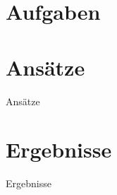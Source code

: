 \documentclass
[
  draft    = true,
  fontsize = 11pt,
  parskip  = half-,
  BCOR     = 0pt,
  DIV      = 11,
  ngerman,
  dvipsnames
]
{scrbook}
\begin{document}


\tableofcontents

\cleardoublepage
{}

\newcommand{\subdir}{}


\chapter{Aufgaben}

\chapter{Ansätze}
%
         {\thechapter{} Ansätze}%

\chapter{Ergebnisse}
%
         {\thechapter{} Ergebnisse}%

\end{document}
